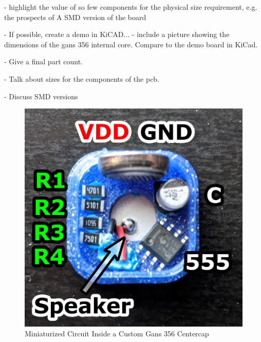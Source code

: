 - highlight the value of so few components for the physical size
requirement, e.g. the prospects of A SMD version of the board

- If possible, create a demo in KiCAD...
- include a picture showing the dimensions of the gans 356 internal
core. Compare to the demo board in KiCad.

- Give a final part count.

- Talk about sizes for the components of the pcb.

- Discuss SMD versions

\begin{figure}[h]
    \centering
    \caption{Miniaturized Circuit Inside a Custom Gans 356 Centercap}
    \label{fig:core-circuit}
    \includegraphics[width=.8\linewidth]{Figures/6 PCB Design/core_labelled.png}
\end{figure}

